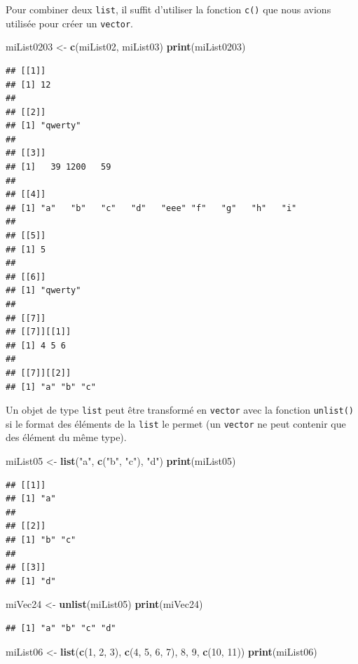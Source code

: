 \documentclass[]{book}
\newenvironment{Shaded}{\begin{snugshade}}{\end{snugshade}}
\newcommand{\DecValTok}[1]{\textcolor[rgb]{0.00,0.00,0.81}{#1}}
\newcommand{\KeywordTok}[1]{\textcolor[rgb]{0.13,0.29,0.53}{\textbf{#1}}}
\newcommand{\NormalTok}[1]{#1}
\newcommand{\StringTok}[1]{\textcolor[rgb]{0.31,0.60,0.02}{#1}}
\begin{document}
Pour combiner deux \texttt{list}, il suffit d'utiliser la fonction \texttt{c()} que nous avions utilisée pour créer un \texttt{vector}.

\begin{Shaded}
\begin{Highlighting}[]
\NormalTok{miList0203 <-}\StringTok{ }\KeywordTok{c}\NormalTok{(miList02, miList03)}
\KeywordTok{print}\NormalTok{(miList0203)}
\end{Highlighting}
\end{Shaded}

\begin{verbatim}
## [[1]]
## [1] 12
## 
## [[2]]
## [1] "qwerty"
## 
## [[3]]
## [1]   39 1200   59
## 
## [[4]]
## [1] "a"   "b"   "c"   "d"   "eee" "f"   "g"   "h"   "i"  
## 
## [[5]]
## [1] 5
## 
## [[6]]
## [1] "qwerty"
## 
## [[7]]
## [[7]][[1]]
## [1] 4 5 6
## 
## [[7]][[2]]
## [1] "a" "b" "c"
\end{verbatim}

Un objet de type \texttt{list} peut être transformé en \texttt{vector} avec la fonction \texttt{unlist()} si le format des éléments de la \texttt{list} le permet (un \texttt{vector} ne peut contenir que des élément du même type).

\begin{Shaded}
\begin{Highlighting}[]
\NormalTok{miList05 <-}\StringTok{ }\KeywordTok{list}\NormalTok{(}\StringTok{"a"}\NormalTok{, }\KeywordTok{c}\NormalTok{(}\StringTok{"b"}\NormalTok{, }\StringTok{"c"}\NormalTok{), }\StringTok{"d"}\NormalTok{)}
\KeywordTok{print}\NormalTok{(miList05)}
\end{Highlighting}
\end{Shaded}

\begin{verbatim}
## [[1]]
## [1] "a"
## 
## [[2]]
## [1] "b" "c"
## 
## [[3]]
## [1] "d"
\end{verbatim}

\begin{Shaded}
\begin{Highlighting}[]
\NormalTok{miVec24 <-}\StringTok{ }\KeywordTok{unlist}\NormalTok{(miList05)}
\KeywordTok{print}\NormalTok{(miVec24)}
\end{Highlighting}
\end{Shaded}

\begin{verbatim}
## [1] "a" "b" "c" "d"
\end{verbatim}

\begin{Shaded}
\begin{Highlighting}[]
\NormalTok{miList06 <-}\StringTok{ }\KeywordTok{list}\NormalTok{(}\KeywordTok{c}\NormalTok{(}\DecValTok{1}\NormalTok{, }\DecValTok{2}\NormalTok{, }\DecValTok{3}\NormalTok{), }\KeywordTok{c}\NormalTok{(}\DecValTok{4}\NormalTok{, }\DecValTok{5}\NormalTok{, }\DecValTok{6}\NormalTok{, }\DecValTok{7}\NormalTok{), }\DecValTok{8}\NormalTok{, }\DecValTok{9}\NormalTok{, }\KeywordTok{c}\NormalTok{(}\DecValTok{10}\NormalTok{, }\DecValTok{11}\NormalTok{))}
\KeywordTok{print}\NormalTok{(miList06)}
\end{Highlighting}
\end{Shaded}
\end{document}
